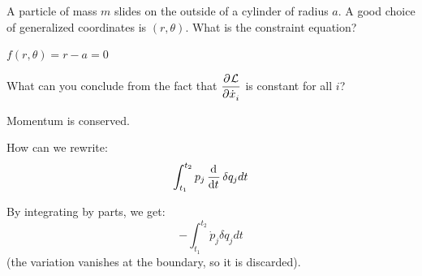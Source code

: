 \documentclass[../PHYS306Notes.tex]{subfiles}
\begin{document}
\begin{p}
A particle of mass $m$ slides on the outside of a cylinder of radius $a$. A good choice of generalized coordinates is $(r, \theta)$. What is the constraint equation?
\end{p}
\begin{s}
$f(r,\theta) = r - a = 0$
\end{s}

\begin{p}
What can you conclude from the fact that $\dpd{\LL}{\dot{x}_i}$ is constant for all $i$?
\end{p}
\begin{s}
Momentum is conserved.
\end{s}

\begin{p}
How can we rewrite:
\[\int_{t_1}^{t_2}p_j\dod{}{t}\delta q_j dt\]
\end{p}
\begin{s}
By integrating by parts, we get:
\[-\int_{t_1}^{t_2}\dot{p}_j\delta q_j dt\]
(the variation vanishes at the boundary, so it is discarded).
\end{s}
\end{document}
